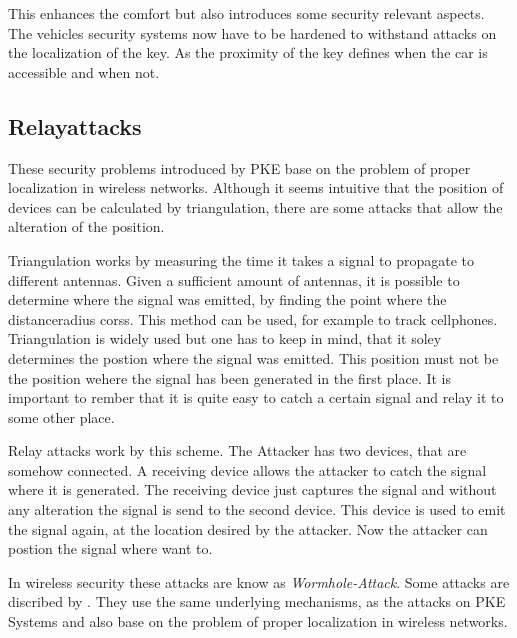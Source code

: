 	This enhances the comfort but also introduces some security relevant aspects.
	The vehicles security systems now have to be hardened
	to withstand attacks on the localization of the key.
	As the proximity of the key defines when the car is accessible and when not. 

\subsection*{Relayattacks}
	These security problems introduced by PKE base on the problem of proper
	localization in wireless networks.
	Although it seems intuitive that the position of devices can be calculated by
	triangulation, there are some attacks that allow the alteration of the position.

	Triangulation works by measuring the time it takes a signal to propagate
	to different antennas.
	Given a sufficient amount of antennas,
	it is possible to determine where the signal was emitted,
	by finding the point where the distanceradius corss. 				%
	This method can be used,
	for example to track cellphones.	%
	Triangulation is widely used but one has to keep in mind,
	that it soley determines the postion where the signal was emitted.
	This position must not be the position wehere the signal has been generated in the first place.
	It is important to rember that it is quite easy to catch
	a certain signal and relay it to some other place.

	Relay attacks work by this scheme.
	The Attacker has two devices,
	that are somehow connected.
	A receiving device allows the attacker to catch the signal where it is generated.
	The receiving device just captures the signal and
	without any alteration the signal is send to the second device.
	This device is used to emit the signal again,
	at the location desired by the attacker.
	Now the attacker can postion the signal where want to.

	In wireless security these attacks are know as \textsl{Wormhole-Attack}.
	Some attacks are discribed by \citeauthor{wormhole}.	%
	They use the same underlying mechanisms, as the attacks on PKE Systems
	and also base on the problem of proper localization in wireless networks.


